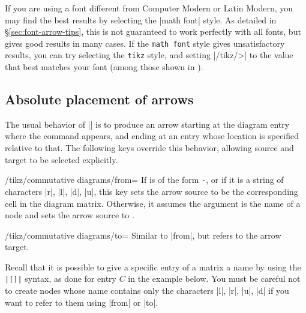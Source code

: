 \documentclass[a4paper]{ltxdoc}
\begin{document}
If you are using a font different from Computer Modern or Latin
Modern, you may find the best results by selecting the |math font|
style.  As detailed in \S\ref{sec:font-arrow-tips}, this is not
guaranteed to work perfectly with all fonts, but gives good results in
many cases.  If the \texttt{math font} style gives unsatisfactory
results, you can try selecting the \texttt{tikz} style, and setting
|/tikz/>| to the value that best matches your font (among those shown
in \cite[\S\ref*{pgfman-section-arrows-meta}]{pgfman}).

\begin{codeexample}[]

\end{codeexample}

\subsection{Absolute placement of arrows}
\label{sec:absol-positioning}

The usual behavior of |\arrow| is to produce an arrow starting at the
diagram entry where the command appears, and ending at an entry whose
location is specified relative to that.  The following keys override
this behavior, allowing source and target to be selected explicitly.

\begin{key}{/tikz/commutative diagrams/from=}
  If  is of the form \texttt{-}, or if it is a string of
  characters |r|, |l|, |d|, |u|, this key sets the arrow source to be
  the corresponding cell in the diagram matrix.  Otherwise, it assumes
  the argument is the name of a node and sets the arrow source to
  .
\end{key}

\begin{key}{/tikz/commutative diagrams/to=}
  Similar to |from|, but refers to the arrow target.
\end{key}

Recall that it is possible to give a specific entry of a \tikzname{}
matrix a name by using the \verb!|[!\verb!]|! syntax, as
done for entry $C$ in the example below.  You must be careful not to
create nodes whose name contains only the characters |l|, |r|, |u|,
|d| if you want to refer to them using |from| or |to|.
\end{document}
